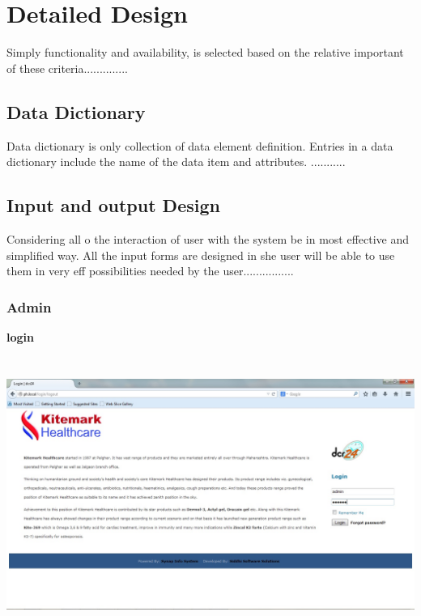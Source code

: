 \chapter{Detailed Design}

Simply functionality and availability, is selected based on the relative important of these criteria.............. 

\section{Data Dictionary}
                                    Data dictionary is only collection of data element definition. Entries in a data dictionary include the name of the data item and attributes. ...........

\section{Input and output Design}

		Considering all o the interaction of user with the system be in most effective and simplified way.                All the input forms are designed in she user will be able to use them in very eff possibilities needed by the user................
		
		
		
		
		
\subsection{Admin}
\pagebreak
\textbf{login}
\begin{center}
\includegraphics[height=9cm,width=14cm]{Admin/login.jpg}
\end{center}


